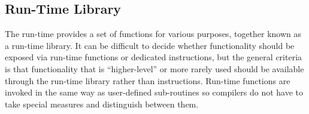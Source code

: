 \subsection{Run-Time Library}

The \thename{} run-time provides a set of functions for various purposes,
together known as a run-time library. It can be difficult to decide whether
functionality should be exposed via run-time functions or dedicated
instructions, but the general criteria is that functionality that is
``higher-level'' or more rarely used should be available through the run-time
library rather than instructions. Run-time functions are invoked in the same way
as user-defined sub-routines so compilers do not have to take special measures
and distinguish between them.

